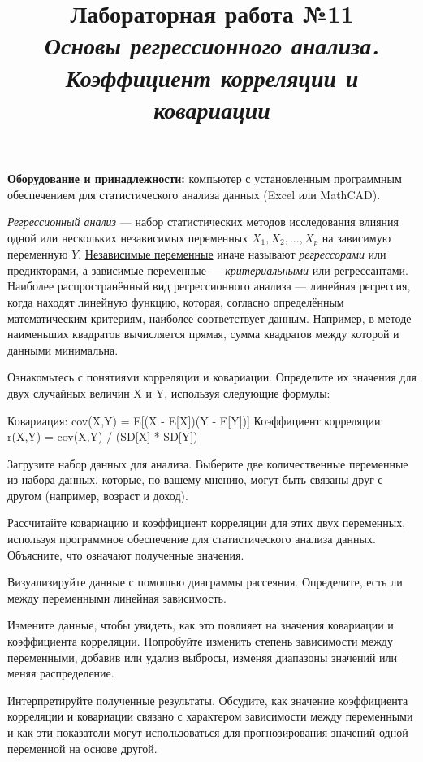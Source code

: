 \documentclass[14pt,a4paper]{article}
\title{Лабораторная работа №11 \\ \textit{Основы регрессионного анализа. Коэффициент корреляции и ковариации}}
\begin{document}
\maketitle

\textbf{Оборудование и принадлежности:} компьютер с установленным программным обеспечением для статистического анализа данных (Excel или MathCAD).

\emph{Регрессионный анализ} — набор статистических методов исследования влияния одной или нескольких независимых переменных $X_{1}, X_{2}, ... , X_{p}$ на зависимую переменную $Y$. \underline{Независимые переменные} иначе называют \emph{регрессорами} или предикторами, а \underline{зависимые переменные} — \emph{критериальными} или регрессантами. Наиболее распространённый вид регрессионного анализа — линейная регрессия, когда находят линейную функцию, которая, согласно определённым математическим критериям, наиболее соответствует данным. Например, в методе наименьших квадратов вычисляется прямая, сумма квадратов между которой и данными минимальна. 

\progress{}

    Ознакомьтесь с понятиями корреляции и ковариации. Определите их значения для двух случайных величин X и Y, используя следующие формулы:

    Ковариация: cov(X,Y) = E[(X - E[X])(Y - E[Y])]
    Коэффициент корреляции: r(X,Y) = cov(X,Y) / (SD[X] * SD[Y])

    Загрузите набор данных для анализа. Выберите две количественные переменные из набора данных, которые, по вашему мнению, могут быть связаны друг с другом (например, возраст и доход).

    Рассчитайте ковариацию и коэффициент корреляции для этих двух переменных, используя программное обеспечение для статистического анализа данных. Объясните, что означают полученные значения.

    Визуализируйте данные с помощью диаграммы рассеяния. Определите, есть ли между переменными линейная зависимость.

    Измените данные, чтобы увидеть, как это повлияет на значения ковариации и коэффициента корреляции. Попробуйте изменить степень зависимости между переменными, добавив или удалив выбросы, изменяя диапазоны значений или меняя распределение.

    Интерпретируйте полученные результаты. Обсудите, как значение коэффициента корреляции и ковариации связано с характером зависимости между переменными и как эти показатели могут использоваться для прогнозирования значений одной переменной на основе другой.
\end{document}
